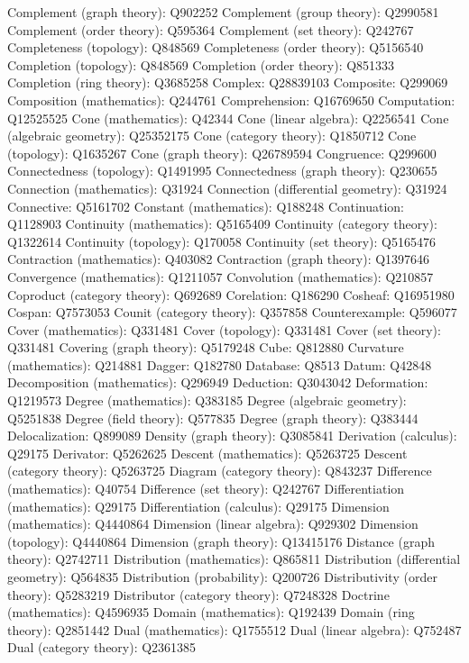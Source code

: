 Complement (graph theory): Q902252
Complement (group theory): Q2990581
Complement (order theory): Q595364
Complement (set theory): Q242767
Completeness (topology): Q848569
Completeness (order theory): Q5156540
Completion (topology): Q848569
Completion (order theory): Q851333
Completion (ring theory): Q3685258
Complex: Q28839103
Composite: Q299069
Composition (mathematics): Q244761
Comprehension: Q16769650
Computation: Q12525525
Cone (mathematics): Q42344
Cone (linear algebra): Q2256541
Cone (algebraic geometry): Q25352175
Cone (category theory): Q1850712
Cone (topology): Q1635267
Cone (graph theory): Q26789594
Congruence: Q299600
Connectedness (topology): Q1491995
Connectedness (graph theory): Q230655
Connection (mathematics): Q31924
Connection (differential geometry): Q31924
Connective: Q5161702
Constant (mathematics): Q188248
Continuation: Q1128903
Continuity (mathematics): Q5165409
Continuity (category theory): Q1322614
Continuity (topology): Q170058
Continuity (set theory): Q5165476
Contraction (mathematics): Q403082
Contraction (graph theory): Q1397646
Convergence (mathematics): Q1211057
Convolution (mathematics): Q210857
Coproduct (category theory): Q692689
Corelation: Q186290
Cosheaf: Q16951980
Cospan: Q7573053
Counit (category theory): Q357858
Counterexample: Q596077
Cover (mathematics): Q331481
Cover (topology): Q331481
Cover (set theory): Q331481
Covering (graph theory): Q5179248
Cube: Q812880
Curvature (mathematics): Q214881
Dagger: Q182780
Database: Q8513
Datum: Q42848
Decomposition (mathematics): Q296949
Deduction: Q3043042
Deformation: Q1219573
Degree (mathematics): Q383185
Degree (algebraic geometry): Q5251838
Degree (field theory): Q577835
Degree (graph theory): Q383444
Delocalization: Q899089
Density (graph theory): Q3085841
Derivation (calculus): Q29175
Derivator: Q5262625
Descent (mathematics): Q5263725
Descent (category theory): Q5263725
Diagram (category theory): Q843237
Difference (mathematics): Q40754
Difference (set theory): Q242767
Differentiation (mathematics): Q29175
Differentiation (calculus): Q29175
Dimension (mathematics): Q4440864
Dimension (linear algebra): Q929302
Dimension (topology): Q4440864
Dimension (graph theory): Q13415176
Distance (graph theory): Q2742711
Distribution (mathematics): Q865811
Distribution (differential geometry): Q564835
Distribution (probability): Q200726
Distributivity (order theory): Q5283219
Distributor (category theory): Q7248328
Doctrine (mathematics): Q4596935
Domain (mathematics): Q192439
Domain (ring theory): Q2851442
Dual (mathematics): Q1755512
Dual (linear algebra): Q752487
Dual (category theory): Q2361385
